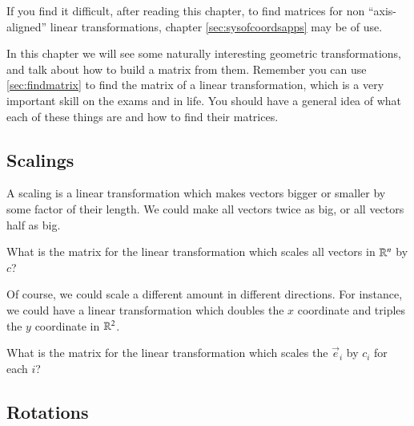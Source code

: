 \begin{Warning}
  If you find it difficult, after reading this chapter, to find matrices for non ``axis-aligned'' linear transformations,  chapter \ref{sec:sysofcoordsapps} may be of use.
\end{Warning}

In this chapter we will see some naturally interesting geometric transformations, and talk about how to build a matrix from them.
Remember you can use \ref{sec:findmatrix} to find the matrix of a linear transformation, which is a very important skill on the exams and in life.  
You should have a general idea of what each of these things are and how to find their matrices.

\subsection{Scalings}

A scaling is a linear transformation which makes vectors bigger or smaller by some factor of their length.
We could make all vectors twice as big, or all vectors half as big.
\begin{EasyEx}
  What is the matrix for the linear transformation which scales all vectors in $\mathbb{R}^n$ by $c$?
\end{EasyEx}
Of course, we could scale a different amount in different directions.
For instance, we could have a linear transformation which doubles the $x$ coordinate and triples the $y$ coordinate in $\mathbb{R}^2$.
\begin{EasyEx}
  What is the matrix for the linear transformation which scales the $\vec{e}_i$ by $c_i$ for each $i$?
\end{EasyEx}


\subsection{Rotations}


